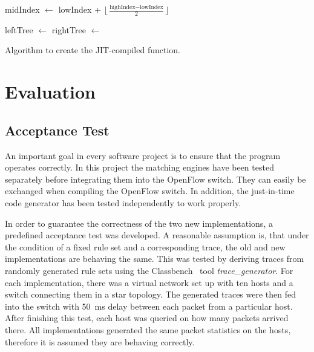 \documentclass[conference]{IEEEtran}
\begin{document}
\begin{algorithm}
\begin{algorithmic}[1]
    \State midIndex $\gets$ lowIndex + $\lfloor\frac{\textrm{highIndex} - \textrm{lowIndex}}{2}\rfloor$
    
        \State {}
        \State {}
        \State {}
        \State {} 
        \State {}
    \EndIf
    
    \State leftTree $\gets$ 
    \State rightTree $\gets$ 
    
    \State {}
    \State {}
    \State {}
    \State {}
    \State {}
    \State {}
    \State {}
    \State {}
\EndFunction
\end{algorithmic}
\caption{Algorithm to create the JIT-compiled function.}
\label{alg:jit}
\end{algorithm}
\vspace{-0.5cm}
\section{Evaluation}
\subsection{Acceptance Test}
An important goal in every software project is to ensure that the program operates correctly.
In this project the matching engines have been tested separately before integrating them into the OpenFlow switch.
They can easily be exchanged when compiling the OpenFlow switch.
In addition, the just-in-time code generator has been tested independently to work properly.

In order to guarantee the correctness of the two new implementations, a predefined acceptance test was developed.
A reasonable assumption is, that under the condition of a fixed rule set and 
a corresponding trace, the old and new implementations are behaving the same.
This was tested by deriving traces from randomly generated rule sets using 
the Classbench~\cite{classbench_website} tool \textit{trace\_generator}.
For each implementation, there was a virtual network set up with ten hosts and a switch connecting them in a star topology.
The generated traces were then fed into the switch with 50\ ms delay between each packet from a particular host.
After finishing this test, each host was queried on how many packets arrived there.
All implementations generated the same packet statistics on the hosts, therefore it is assumed they are behaving correctly.
\end{document}
